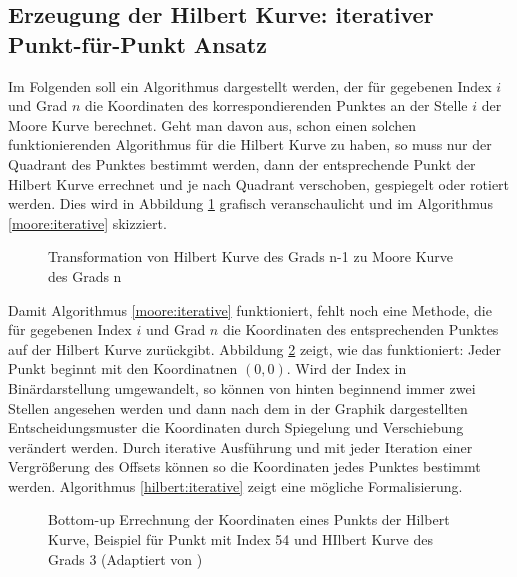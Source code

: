\documentclass[course=erap]{aspdoc}
\begin{document}
\subsection{Erzeugung der Hilbert Kurve: iterativer Punkt-für-Punkt Ansatz}
Im Folgenden soll ein Algorithmus dargestellt werden, der für gegebenen Index $i$ und Grad $n$ die Koordinaten des korrespondierenden Punktes an der Stelle $i$ der Moore Kurve berechnet.
Geht man davon aus, schon einen solchen funktionierenden Algorithmus für die Hilbert Kurve zu haben, so muss nur der Quadrant des Punktes bestimmt werden, dann der entsprechende Punkt der Hilbert Kurve errechnet und je nach Quadrant verschoben, gespiegelt oder rotiert werden. Dies wird in Abbildung \ref{HilbertZuMoore} grafisch veranschaulicht und im Algorithmus \ref{moore:iterative} skizziert.
\begin{figure}[h]
\centering
\def\svgwidth{240pt}

\caption{Transformation von Hilbert Kurve des Grads n-1 zu Moore Kurve des Grads n}
\label{HilbertZuMoore}
\end{figure}
Damit Algorithmus \ref{moore:iterative} funktioniert, fehlt noch eine Methode, die für gegebenen Index $i$ und Grad $n$ die Koordinaten des entsprechenden Punktes auf der Hilbert Kurve zurückgibt. Abbildung \ref{fig:hilbertBuildup} zeigt, wie das funktioniert: Jeder Punkt beginnt mit den Koordinatnen $(0, 0)$. Wird der Index in Binärdarstellung umgewandelt, so können von hinten beginnend immer zwei Stellen angesehen werden und dann nach dem in der Graphik dargestellten Entscheidungsmuster die Koordinaten durch Spiegelung und Verschiebung verändert werden. Durch iterative Ausführung und mit jeder Iteration einer Vergrößerung des Offsets können so die Koordinaten jedes Punktes bestimmt werden. \cite{Chwedzuk2016} Algorithmus \ref{hilbert:iterative} zeigt eine mögliche Formalisierung.

\begin{figure}[h]
    \centering
    \caption{Bottom-up Errechnung der Koordinaten eines Punkts der Hilbert Kurve, Beispiel für Punkt mit Index 54 und HIlbert Kurve des Grads 3 (Adaptiert von \cite{Chwedzuk2016})}%
    \label{fig:hilbertBuildup}%
\end{figure}
\end{document}
